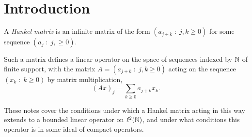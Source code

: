 \documentclass{unswmaths}
\begin{document}
\subject{}
\author{}
\title{}
\studentno{}


\newcommand{\Real}{\operatorname{Re}}
\newcommand{\Img}{\operatorname{Im}}
\newcommand{\lan}{\langle}
\newcommand{\ran}{\rangle}
\newcommand{\Proj}{\mathbb{P}}
\newcommand{\isom}{\cong}
\newcommand{\id}{{\operatorname{id}}}
\newcommand{\ha}{\boldsymbol{m}}
\newcommand{\Circ}{\mathbb{T}}
\newcommand{\BMO}{{BMO}}
\newcommand{\sgn}{\operatorname{sgn}}
\newcommand{\Diff}{\mathcal{D}}
\newcommand{\pvint}{\mathrm{p.v.}\int}

\section*{Introduction}
    A \emph{Hankel matrix} is an infinite matrix of the form $(a_{j+k}\;:\;j,k\geq 0)$ for some 
    sequence $(a_j\;:\;j,\geq 0)$.
    
    Such a matrix defines a linear operator on the space of sequences indexed by $\mathbb{N}$ of finite support,
    with the matrix $A = (a_{j+k}\;:\;j,k\geq 0)$ acting on the sequence $(x_k\;:\;k\geq 0)$ by matrix
    multiplication,
    \begin{equation*}
        (Ax)_j = \sum_{k\geq 0} a_{j+k}x_k.
    \end{equation*}
    
    These notes cover the conditions under which a Hankel matrix acting in this way extends to a bounded linear
    operator on $\ell^2(\mathbb{N})$, and under what conditions this operator is in some ideal of
    compact operators.
    
\end{document}
